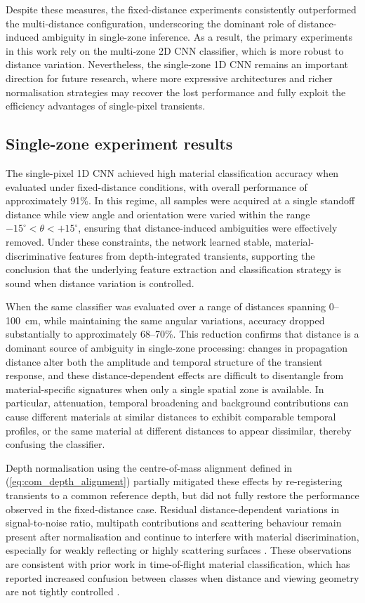 \documentclass[12pt,a4paper,oneside]{report}
\begin{document}
Despite these measures, the fixed-distance experiments consistently outperformed the multi-distance configuration, underscoring the dominant role of distance-induced ambiguity in single-zone inference. As a result, the primary experiments in this work rely on the multi-zone 2D CNN classifier, which is more robust to distance variation. Nevertheless, the single-zone 1D CNN remains an important direction for future research, where more expressive architectures and richer normalisation strategies may recover the lost performance and fully exploit the efficiency advantages of single-pixel transients.


\subsection{Single-zone experiment results}
\label{subsec:single_experiment_results}

\noindent The single-pixel 1D CNN achieved high material classification accuracy when evaluated under fixed-distance conditions, with overall performance of approximately 91\%. In this regime, all samples were acquired at a single standoff distance while view angle and orientation were varied within the range $-15^{\circ} < \theta < +15^{\circ}$, ensuring that distance-induced ambiguities were effectively removed. Under these constraints, the network learned stable, material-discriminative features from depth-integrated transients, supporting the conclusion that the underlying feature extraction and classification strategy is sound when distance variation is controlled.

When the same classifier was evaluated over a range of distances spanning 0--100~cm, while maintaining the same angular variations, accuracy dropped substantially to approximately 68--70\%. This reduction confirms that distance is a dominant source of ambiguity in single-zone processing: changes in propagation distance alter both the amplitude and temporal structure of the transient response, and these distance-dependent effects are difficult to disentangle from material-specific signatures when only a single spatial zone is available. In particular, attenuation, temporal broadening and background contributions can cause different materials at similar distances to exhibit comparable temporal profiles, or the same material at different distances to appear dissimilar, thereby confusing the classifier.

Depth normalisation using the centre-of-mass alignment defined in (\ref{eq:com_depth_alignment}) partially mitigated these effects by re-registering transients to a common reference depth, but did not fully restore the performance observed in the fixed-distance case. Residual distance-dependent variations in signal-to-noise ratio, multipath contributions and scattering behaviour remain present after normalisation and continue to interfere with material discrimination, especially for weakly reflecting or highly scattering surfaces \cite{su2016,tafone2023}. These observations are consistent with prior work in time-of-flight material classification, which has reported increased confusion between classes when distance and viewing geometry are not tightly controlled \cite{callenberg2021}.
\end{document}
